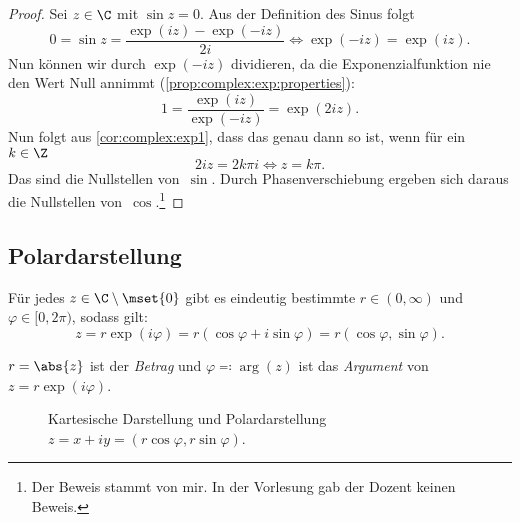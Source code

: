 \documentclass[a4paper]{article}
\begin{document}
\begin{proof}
    Sei $z \in \C$ mit $\sin z = 0$. Aus der Definition des Sinus folgt
    \begin{equation*}
        0 = \sin z = \frac{\exp(iz)-\exp(-iz)}{2i} \iff \exp(-iz) = \exp(iz).
    \end{equation*}
    Nun können wir durch $\exp(-iz)$ dividieren, da die Exponenzialfunktion nie den Wert Null annimmt (\cref{prop:complex:exp:properties}):
    \begin{equation*}
        1 = \frac{\exp(iz)}{\exp(-iz)} = \exp(2iz).
    \end{equation*}
    Nun folgt aus \cref{cor:complex:exp1}, dass das genau dann so ist, wenn für ein~$k \in \Z$
    \begin{equation*}
        2iz = 2k\pi i \iff z = k\pi.
    \end{equation*}
    Das sind die Nullstellen von~$\sin$. Durch Phasenverschiebung ergeben sich daraus die Nullstellen von~$\cos$.\footnote{Der Beweis stammt von mir. In der Vorlesung gab der Dozent keinen Beweis.}
\end{proof}

\subsection{Polardarstellung}

\begin{proposition}
    Für jedes $z \in \C\setminus\mset{0}$ gibt es eindeutig bestimmte $r \in (0,\infty)$ und~$\varphi \in [0, 2\pi)$, sodass gilt:
    \begin{equation*}
        z = r\exp(i\varphi) = r (\cos\varphi + i\sin\varphi) = r(\cos\varphi,\sin\varphi).
    \end{equation*}
\end{proposition}

\begin{notation}
    $r = \abs{z}$ ist der \emph{Betrag} und $\varphi \eqqcolon \arg(z)$ ist das \emph{Argument} von~$z = r\exp(i\varphi)$.
\end{notation}

\begin{figure}
    \caption{Kartesische Darstellung und Polardarstellung $z = x+iy = (r\cos\varphi,r\sin\varphi)$.}
\end{figure}
\end{document}
